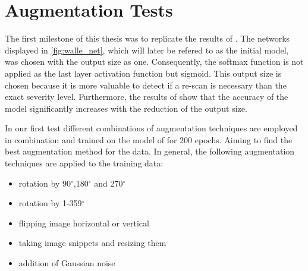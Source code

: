 \documentclass[
a4paper, 
12pt,
grayscalebody, %
abstract=on,
twoside, BCOR10mm, 12pt, DIV13,headinclude, footexclude, final, abstracton, openright
]{ibireprt}
\numberwithin{equation}{chapter}
\numberwithin{table}{chapter}
\numberwithin{figure}{chapter}
\numberwithin{algorithm}{chapter}
\numberwithin{example}{chapter}
\numberwithin{example}{chapter}
\begin{document}
\section{Augmentation Tests}
The first milestone of this thesis was to replicate the results of \cite{Walle2023}. The networks displayed in \ref{fig:walle_net}, which will later be refered to as the initial model, was chosen with the output size as one. Consequently, the softmax function is not applied as the last layer activation function but sigmoid. This output size is chosen because it is more valuable to detect if a re-scan is necessary than the exact severity level. Furthermore, the results of \cite{Walle2023} show that the accuracy of the model significantly increases with the reduction of the output size.

In our first test different combinations of augmentation techniques are employed in combination and trained on the model of \cite{Walle2023} for 200 epochs. Aiming to find the best augmentation method for the data. In general, the following augmentation techniques are applied to the training data: 


\begin{itemize}
	\item rotation by 90$^{\circ}$,180$^{\circ}$ and 270$^{\circ}$
	\item rotation by 1-359$^{\circ}$
	\item flipping image horizontal or vertical 
	\item taking image snippets and resizing them 
	\item addition of Gaussian noise 
\end{itemize}
\end{document}
